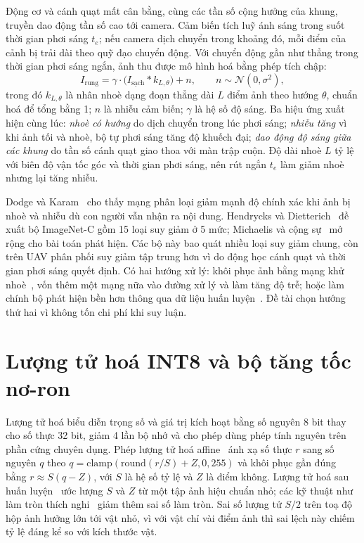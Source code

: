 Động cơ và cánh quạt mất cân bằng, cùng các tần số cộng hưởng của khung, truyền dao động tần số cao tới camera. Cảm biến tích luỹ ánh sáng trong suốt thời gian phơi sáng $t_e$; nếu camera dịch chuyển trong khoảng đó, mỗi điểm của cảnh bị trải dài theo quỹ đạo chuyển động. Với chuyển động gần như thẳng trong thời gian phơi sáng ngắn, ảnh thu được mô hình hoá bằng phép tích chập:
\begin{equation}
I_{\text{rung}} = \gamma \cdot \big(I_{\text{sạch}} * k_{L,\theta}\big) + n, \qquad n \sim \mathcal{N}(0, \sigma^2),
\label{eq:rung}
\end{equation}
trong đó $k_{L,\theta}$ là nhân nhoè dạng đoạn thẳng dài $L$ điểm ảnh theo hướng $\theta$, chuẩn hoá để tổng bằng 1; $n$ là nhiễu cảm biến; $\gamma$ là hệ số độ sáng. Ba hiệu ứng xuất hiện cùng lúc: \textit{nhoè có hướng} do dịch chuyển trong lúc phơi sáng; \textit{nhiễu tăng} vì khi ảnh tối và nhoè, bộ tự phơi sáng tăng độ khuếch đại; \textit{dao động độ sáng giữa các khung} do tần số cánh quạt giao thoa với màn trập cuộn. Độ dài nhoè $L$ tỷ lệ với biên độ vận tốc góc và thời gian phơi sáng, nên rút ngắn $t_e$ làm giảm nhoè nhưng lại tăng nhiễu.

Dodge và Karam~\cite{dodge2016quality} cho thấy mạng phân loại giảm mạnh độ chính xác khi ảnh bị nhoè và nhiễu dù con người vẫn nhận ra nội dung. Hendrycks và Dietterich~\cite{hendrycks2019imagenetc} đề xuất bộ ImageNet-C gồm 15 loại suy giảm ở 5 mức; Michaelis và cộng sự~\cite{michaelis2019winter} mở rộng cho bài toán phát hiện. Các bộ này bao quát nhiều loại suy giảm chung, còn trên UAV phân phối suy giảm tập trung hơn vì do động học cánh quạt và thời gian phơi sáng quyết định. Có hai hướng xử lý: khôi phục ảnh bằng mạng khử nhoè~\cite{nah2017deblur,kupyn2018deblurgan}, vốn thêm một mạng nữa vào đường xử lý và làm tăng độ trễ; hoặc làm chính bộ phát hiện bền hơn thông qua dữ liệu huấn luyện~\cite{shorten2019augmentation}. Đề tài chọn hướng thứ hai vì không tốn chi phí khi suy luận.

\section{Lượng tử hoá INT8 và bộ tăng tốc nơ-ron}

Lượng tử hoá biểu diễn trọng số và giá trị kích hoạt bằng số nguyên 8 bit thay cho số thực 32 bit, giảm 4 lần bộ nhớ và cho phép dùng phép tính nguyên trên phần cứng chuyên dụng. Phép lượng tử hoá affine~\cite{jacob2018quantization} ánh xạ số thực $r$ sang số nguyên $q$ theo $q = \mathrm{clamp}(\mathrm{round}(r/S) + Z, 0, 255)$ và khôi phục gần đúng bằng $r \approx S(q - Z)$, với $S$ là hệ số tỷ lệ và $Z$ là điểm không. Lượng tử hoá sau huấn luyện~\cite{krishnamoorthi2018whitepaper} ước lượng $S$ và $Z$ từ một tập ảnh hiệu chuẩn nhỏ; các kỹ thuật như làm tròn thích nghi~\cite{nagel2020adaround} giảm thêm sai số làm tròn. Sai số lượng tử $S/2$ trên toạ độ hộp ảnh hưởng lớn tới vật nhỏ, vì với vật chỉ vài điểm ảnh thì sai lệch này chiếm tỷ lệ đáng kể so với kích thước vật.

